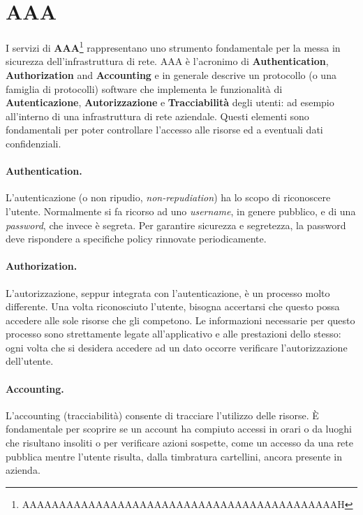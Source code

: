 \section{AAA}

I servizi di \textbf{AAA}\footnote{AAAAAAAAAAAAAAAAAAAAAAAAAAAAAAAAAAAAAAAAAAAH}
rappresentano uno strumento fondamentale per la messa in sicurezza dell’infrastruttura
di rete.
AAA è l'acronimo
di \textbf{Authentication}, \textbf{Authorization} and \textbf{Accounting} e in
generale descrive un protocollo (o una famiglia di protocolli) software che
implementa le funzionalità di \textbf{Autenticazione}, \textbf{Autorizzazione}
e \textbf{Tracciabilità} degli utenti: ad esempio all'interno di una infrastruttura
di rete aziendale. Questi elementi sono fondamentali per poter controllare
l'accesso alle risorse ed a eventuali dati confidenziali.

\paragraph{Authentication.}
L’autenticazione (o non ripudio, \textit{non-repudiation}) ha lo scopo di
riconoscere l’utente. Normalmente si fa ricorso ad uno \textit{username}, in
genere pubblico, e di una \textit{password}, che invece è segreta. Per garantire
sicurezza e segretezza, la password deve rispondere a specifiche policy rinnovate
periodicamente.

\paragraph{Authorization.}
L’autorizzazione, seppur integrata con l’autenticazione, è un processo molto
differente. Una volta riconosciuto l’utente, bisogna accertarsi che questo possa
accedere alle sole risorse che gli competono. Le informazioni necessarie per
questo processo sono strettamente legate all’applicativo e alle prestazioni dello
stesso: ogni volta che si desidera accedere ad un dato occorre verificare
l’autorizzazione dell’utente.

\paragraph{Accounting.}
L’accounting (tracciabilità) consente di tracciare l’utilizzo delle risorse.
È fondamentale per scoprire se un account ha compiuto accessi in orari o da luoghi
che risultano insoliti o per verificare azioni sospette,
come un accesso da una rete pubblica mentre l’utente risulta, dalla timbratura cartellini,
ancora presente in azienda.